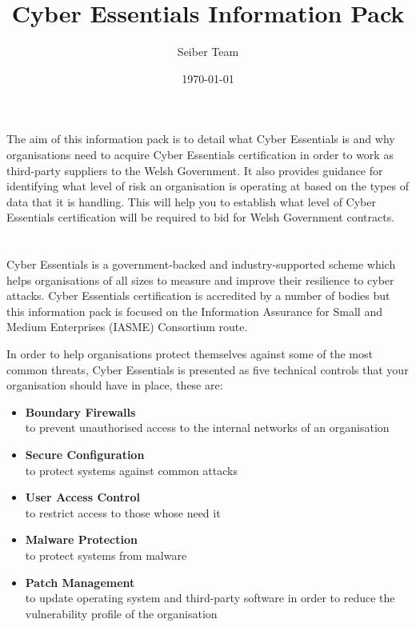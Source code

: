 \documentclass[12pt]{article}
\title{Cyber Essentials Information Pack}
\author{Seiber Team}
\date{\today}
\begin{document}

\section*{}
The aim of this information pack is to detail what Cyber Essentials is and why organisations need to acquire Cyber Essentials certification in order to work as third-party suppliers to the Welsh Government. It also provides guidance for identifying what level of risk an organisation is operating at based on the types of data that it is handling. This will help you to establish what level of Cyber Essentials certification will be required to bid for Welsh Government contracts.


\section*{}
Cyber Essentials is a government-backed and industry-supported scheme which helps organisations of all sizes to measure and improve their resilience to cyber attacks. Cyber Essentials certification is accredited by a number of bodies but this information pack is focused on the Information Assurance for Small and Medium Enterprises (IASME) Consortium route.

In order to help organisations protect themselves against some of the most common threats, Cyber Essentials is presented as five technical controls that your organisation should have in place, these are:
\begin{itemize}
  \item \textbf{Boundary Firewalls} \\to prevent unauthorised access to the internal networks of an organisation
  \item \textbf{Secure Configuration} \\to protect systems against common attacks
  \item \textbf{User Access Control} \\to restrict access to those whose need it
  \item \textbf{Malware Protection} \\to protect systems from malware
  \item \textbf{Patch Management} \\to update operating system and third-party software in order to reduce the vulnerability profile of the organisation
\end{itemize}
\end{document}
